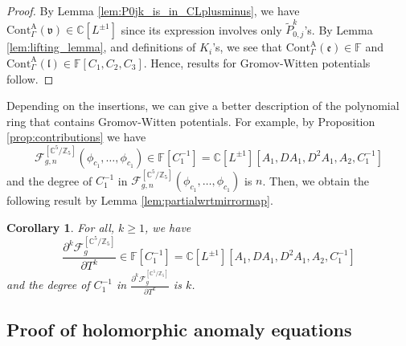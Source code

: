 \documentclass[12pt]{amsart}
\newtheorem{cor}[prop]{Corollary}
\numberwithin{equation}{section}
\begin{document}
\begin{proof}
By Lemma \ref{lem:P0jk_is_in_CLplusminus}, we have $\mathrm{Cont}_{\Gamma}^{\mathrm{A}}(\mathfrak{v})\in\mathbb{C}[L^{\pm 1}]$ since its expression involves only $\widetilde{P}_{0,j}^k$'s. By Lemma \ref{lem:lifting_lemma}, and definitions of $K_i$'s, we see that $\mathrm{Cont}_{\Gamma}^{\mathrm{A}}(\mathfrak{e})\in\mathbb{F}$ and $\mathrm{Cont}_{\Gamma}^{\mathrm{A}}(\mathfrak{l})\in\mathbb{F}[C_1, C_2, C_3]$. Hence, results for Gromov-Witten potentials follow.
\end{proof}


Depending on the insertions, we can give a better description of the polynomial ring that contains  Gromov-Witten potentials. For example, by Proposition \ref{prop:contributions} we have
\begin{equation}
\mathcal{F}_{g, n}^{\left[\mathbb{C}^{5} / \mathbb{Z}_{5}\right]}\left(\phi_{c_{1}}, \ldots, \phi_{c_{1}}\right)\in\mathbb{F}[C_1^{-1}]=\mathbb{C}[L^{\pm 1}][A_1,DA_1,D^2A_1,A_2,C_1^{-1}]
\end{equation}
and the degree of $C_1^{-1}$ in $\mathcal{F}_{g, n}^{\left[\mathbb{C}^{5} / \mathbb{Z}_{5}\right]}\left(\phi_{c_{1}}, \ldots, \phi_{c_{1}}\right)$ is $n$. Then, we obtain the following result by Lemma \ref{lem:partialwrtmirrormap}.

\begin{cor}
For all, $k\geq{1}$, we have
\begin{equation*}
\frac{\partial^k\mathcal{F}_{g}^{\left[\mathbb{C}^{5} / \mathbb{Z}_{5}\right]}}{\partial T^k}\in\mathbb{F}[C_1^{-1}]=\mathbb{C}[L^{\pm 1}][A_1,DA_1,D^2A_1,A_2,C_1^{-1}]
\end{equation*}
and the degree of $C_1^{-1}$ in $\frac{\partial^k\mathcal{F}_{g}^{\left[\mathbb{C}^{5} / \mathbb{Z}_{5}\right]}}{\partial T^k}$ is $k$.
\end{cor}





\subsection{Proof of holomorphic anomaly equations}\label{subsec:HAE_proof}
\end{document}

